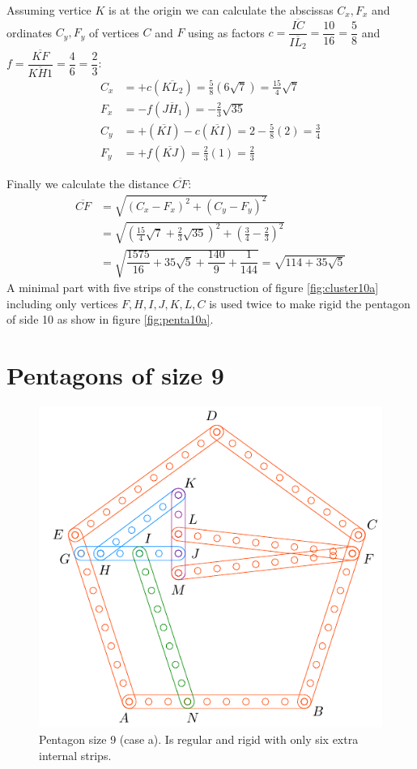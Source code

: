 \documentclass[11pt]{article}
\begin{document}
Assuming vertice $K$ is at the origin we can calculate the abscissas $C_x,F_x$ and ordinates $C_y,F_y$ of vertices $C$ and $F$ using as factors $c = \dfrac{\overline{IC}}{\overline{IL_2}} = \dfrac{10}{16} = \dfrac{5}8$ and $f = \dfrac{\overline{KF}}{\overline{KH1}}=\dfrac{4}6 = \dfrac{2}3$:
\begin{align}
C_x &= +c(\overline{KL_2}) = \frac{5}{8}(6\sqrt7) = \frac{15}{4}\sqrt7\\
F_x &= -f(\overline{JH_1}) = -\frac{2}{3}\sqrt{35}\\
C_y &= +(\overline{KI}) - c(\overline{KI}) = 2 - \frac{5}{8}(2) = \frac{3}4\\
F_y &= +f(\overline{KJ}) = \frac{2}{3}(1) = \frac{2}3
\end{align}

Finally we calculate the distance $\overline{CF}$:
\begin{align}
\overline{CF} &= \sqrt{(C_x - F_x)^2 + (C_y - F_y)^2}\nonumber\\
 &= \sqrt{\left(\frac{15}{4}\sqrt7 + \frac{2}{3}\sqrt{35}\right)^2
 + \left(\frac{3}4 - \frac{2}3\right)^2}\nonumber\\
 &= \sqrt{\dfrac{1575}{16} + 35\sqrt5 + \dfrac{140}9 + \dfrac{1}{144}} = \sqrt{114+35\sqrt5}
\end{align}
A minimal part with five strips of the construction of figure \ref{fig:cluster10a} including only vertices $F,H,I,J,K,L,C$ is used twice to make rigid the pentagon of side 10 as show in figure \ref{fig:penta10a}.

\section{Pentagons of size 9}

\begin{figure}[h]
 \centering
 \includegraphics[scale=1]{9/penta9a}
 \caption{Pentagon size 9 (case a). Is regular and rigid with only six extra internal strips.}
 \label{fig:penta9a}
\end{figure}
\end{document}
